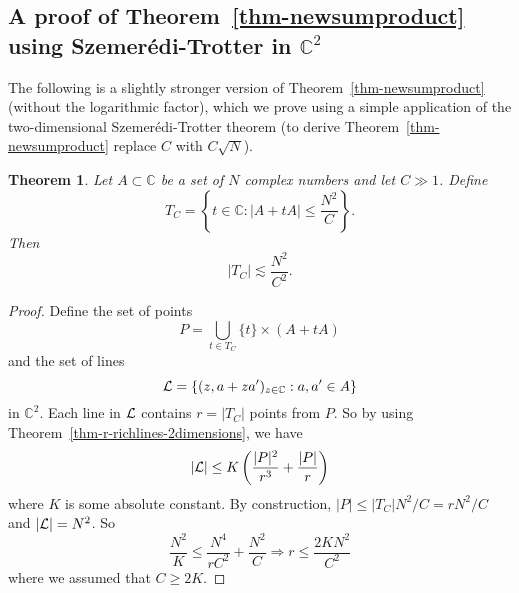 \documentclass[11pt]{article}
\newtheorem{thm}{Theorem}[section]
\def\C{{\mathbb{C}}}
\def\cL{{\cal L}}
\begin{document}
\subsection{A proof of Theorem~\ref{thm-newsumproduct} using Szemer\'edi-Trotter in $\C^2$}
\label{sec-newsumproduct-usingST}
The following is a slightly stronger version of Theorem~\ref{thm-newsumproduct} (without the logarithmic factor), which we prove using a simple application of the two-dimensional Szemer\'edi-Trotter theorem (to derive Theorem~\ref{thm-newsumproduct} replace $C$ with $C\sqrt{N}$).
\begin{thm}
Let $A\subset \C$ be a set of $N$ complex numbers and let $C\gg1$. Define $$T_C=\left\{t\in \C: |A+tA|\le \frac{N^2}{C}\right\}.$$ Then 
$$|T_C|\lesssim \frac{N^2}{C^2}.$$
\end{thm}
\begin{proof}
Define the set of points $$P=\bigcup_{t\in T_C}\{t\}\times(A+tA)$$ and the set of lines $$\cL=\{(z,a+za')_{z\in \C}: a,a'\in A\}$$ in $\C^2$. Each line in $\cL$ contains $r=|T_C|$ points from $P$. So by using Theorem~\ref{thm-r-richlines-2dimensions}, we have
$$|\cL|\le K\left(\frac{|P|^2}{r^3}+\frac{|P|}{r}\right)$$ where $K$ is some absolute constant. By construction, $|P|\le |T_C|N^2/C=rN^2/C$ and $|\cL|=N^2$. So
$$\frac{N^2}{K}\le \frac{N^4}{rC^2}+\frac{N^2}{C}\Rightarrow r\le \frac{2KN^2}{C^2}$$
where we assumed that $C\ge 2K$.
\end{proof} 






\end{document}
